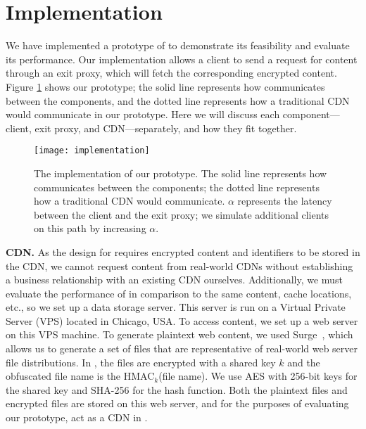 \section{Implementation}
\label{sec:implementation}

We have implemented a prototype of \system{} to demonstrate its feasibility and 
evaluate its performance.  Our implementation allows a client to send a request 
for content through an exit proxy, which will fetch the corresponding 
encrypted content.  Figure \ref{fig:impl} shows our prototype; the solid line represents
how \system{} communicates between the components, and the dotted line represents how 
a traditional CDN would communicate in our prototype.  Here we will discuss each component---client, exit proxy, 
and CDN---separately, and how they fit together.

\begin{figure}[t]
\centering
\texttt{[image: implementation]}
\caption{The implementation of our \system{} prototype.  The solid line represents
how \system{} communicates between the components; the dotted line represents how 
a traditional CDN would communicate. $\alpha$ represents the latency between the client 
and the exit proxy; we simulate additional clients on this path by increasing $\alpha$.}
\label{fig:impl}
\end{figure}

\textbf{CDN.} As the design for \system{} requires encrypted content and identifiers
to be stored in the CDN, we cannot request content from real-world CDNs without
establishing a business relationship with an existing CDN ourselves. Additionally,
we must evaluate the performance of \system{} in comparison to the same content, cache locations, etc., so 
we set up a data storage server.  This server is run on a Virtual Private Server
(VPS) located in
Chicago, USA.  To access content, we set up a web server on this VPS machine.  To generate 
plaintext web content, we used Surge~\cite{barford1998generating}, which allows us 
to generate a set of files that are representative of real-world web server file distributions.  
In \system{}, the files are encrypted with a shared key $k$ and the obfuscated file name is the 
HMAC$_{k}$(file name).  We use AES with 256-bit keys for the shared key and SHA-256
for the 
hash function.  Both the plaintext files and encrypted files are stored on this web server, and 
for the purposes of evaluating our prototype, act as a CDN in \system{}.

